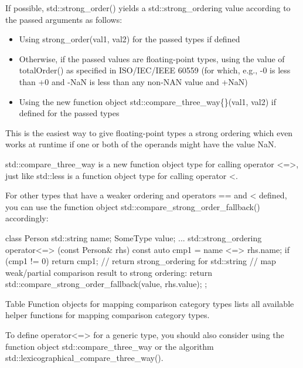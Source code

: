 If possible, std::strong\_order() yields a std::strong\_ordering value according to the passed arguments as follows:

\begin{itemize}
\item
Using strong\_order(val1, val2) for the passed types if defined

\item
Otherwise, if the passed values are floating-point types, using the value of totalOrder() as specified in ISO/IEC/IEEE 60559 (for which, e.g., -0 is less than +0 and -NaN is less than any non-NAN value and +NaN)

\item
Using the new function object std::compare\_three\_way\{\}(val1, val2) if defined for the passed types
\end{itemize}

This is the easiest way to give floating-point types a strong ordering which even works at runtime if one or both of the operands might have the value NaN.

std::compare\_three\_way is a new function object type for calling operator <=>, just like std::less is a function object type for calling operator <.

For other types that have a weaker ordering and operators == and < defined, you can use the function object std::compare\_strong\_order\_fallback() accordingly:

\begin{cpp}
class Person {
	std::string name;
	SomeType value;
	...
	std::strong_ordering operator<=> (const Person& rhs) const {
		auto cmp1 = name <=> rhs.name;
		if (cmp1 != 0) return cmp1; // return strong_ordering for std::string
		// map weak/partial comparison result to strong ordering:
		return std::compare_strong_order_fallback(value, rhs.value);
	}
};
\end{cpp}

Table Function objects for mapping comparison category types lists all available helper functions for mapping comparison category types.

To define operator<=> for a generic type, you should also consider using the function object std::compare\_three\_way or the algorithm std::lexicographical\_compare\_three\_way().
